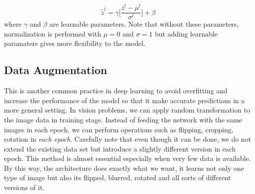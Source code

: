 \documentclass[12pt]{article}
\begin{document}
\begin{equation}
\tilde{z}^{l} = \gamma\Big[\dfrac{z^{l}-\mu^{l} }{\sigma^{l}}\Big]+\beta 
\end{equation} 
where $\gamma$ and $\beta$ are learnable parameters. Note that without these parameters, normalization is performed with $\mu=0$ and $\sigma=1$ but adding learnable paramaters gives more flexibility to the model.
\subsection{Data Augmentation}

This is another common practice in deep learning to avoid overfitting and increase the performance of the model so that it make accurate predictions in a more general setting. In vision problems, we can apply random transformation to the image data in training stage. Instead of feeding the network with the same images in each epoch, we can perform operations such as flipping, cropping, rotation in \textit{each epoch}. Carefully note that even though it can be done, we do not extend the existing data set but introduce a slightly different version in each epoch. This method is almost essential especially when very few data is available. By this way, the architecture does exactly what we want, it learns not only one type of image but also its flipped, blurred, rotated and all sorts of different versions of it.  
\end{document}
